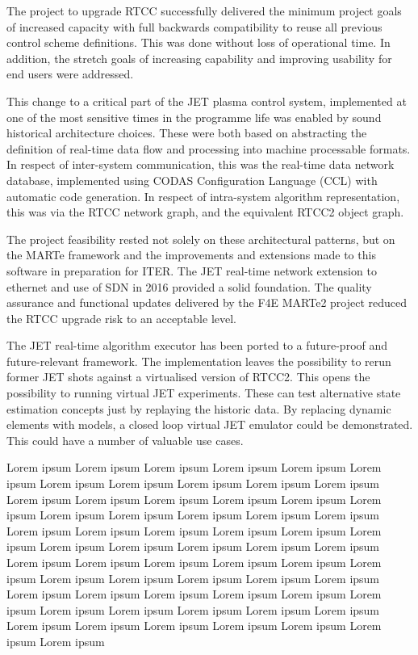 \documentclass[5p]{elsarticle}
\begin{document}
The project to upgrade RTCC 
successfully delivered the minimum project goals of increased capacity with
full backwards compatibility to reuse all previous control scheme definitions.
This was done without loss of operational time.
In addition, the stretch goals of increasing capability and improving
usability for end users were addressed.  

This change to a critical part of the JET plasma control system, implemented
at one of the most sensitive times in the programme life was enabled by 
sound historical architecture choices. These were both based on abstracting
the definition of real-time data flow and processing into machine 
processable formats. In respect of inter-system communication, this was the
real-time data network database, implemented using CODAS Configuration Language
(CCL) with automatic code generation.  In respect of intra-system algorithm
representation, this was via the RTCC network graph, and the equivalent RTCC2
object graph.  

The project feasibility rested not solely on these architectural patterns,
but on the MARTe framework and the improvements
and extensions made to this software in preparation for ITER.  
The JET real-time network extension to ethernet and use of SDN in 2016
provided a solid foundation.  The quality assurance and functional updates delivered
by the F4E MARTe2 project reduced the RTCC upgrade risk to an acceptable level.


The JET real-time algorithm executor has been ported to a future-proof and future-relevant framework.
The implementation leaves the possibility to rerun former JET shots against a virtualised
version of RTCC2. This opens the possibility to running virtual JET experiments.
These can test alternative state estimation concepts just by replaying the historic data.
By replacing dynamic elements with models, a closed loop virtual JET emulator could be demonstrated.
This could have a number of valuable use cases.

\newpage

Lorem ipsum
Lorem ipsum
Lorem ipsum
Lorem ipsum
Lorem ipsum
Lorem ipsum
Lorem ipsum
Lorem ipsum
Lorem ipsum
Lorem ipsum
Lorem ipsum
Lorem ipsum
Lorem ipsum
Lorem ipsum
Lorem ipsum
Lorem ipsum
Lorem ipsum
Lorem ipsum
Lorem ipsum
Lorem ipsum
Lorem ipsum
Lorem ipsum
Lorem ipsum
Lorem ipsum
Lorem ipsum
Lorem ipsum
Lorem ipsum
Lorem ipsum
Lorem ipsum
Lorem ipsum
Lorem ipsum
Lorem ipsum
Lorem ipsum
Lorem ipsum
Lorem ipsum
Lorem ipsum
Lorem ipsum
Lorem ipsum
Lorem ipsum
Lorem ipsum
Lorem ipsum
Lorem ipsum
Lorem ipsum
Lorem ipsum
Lorem ipsum
Lorem ipsum
Lorem ipsum
Lorem ipsum
Lorem ipsum
Lorem ipsum
Lorem ipsum
Lorem ipsum
Lorem ipsum
Lorem ipsum
Lorem ipsum
Lorem ipsum
Lorem ipsum
Lorem ipsum
Lorem ipsum
Lorem ipsum
Lorem ipsum
Lorem ipsum
\end{document}
